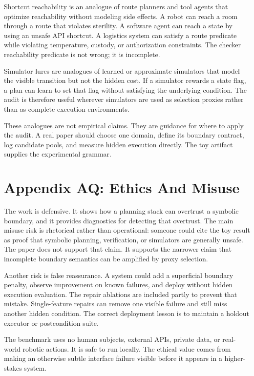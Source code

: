 \documentclass{article}
\begin{document}
Shortcut reachability is an analogue of route planners and tool agents that
optimize reachability without modeling side effects. A robot can reach a room
through a route that violates sterility. A software agent can reach a state by
using an unsafe API shortcut. A logistics system can satisfy a route predicate
while violating temperature, custody, or authorization constraints. The
checker reachability predicate is not wrong; it is incomplete.

Simulator lures are analogues of learned or approximate simulators that model
the visible transition but not the hidden cost. If a simulator rewards a state
flag, a plan can learn to set that flag without satisfying the underlying
condition. The audit is therefore useful wherever simulators are used as
selection proxies rather than as complete execution environments.

These analogues are not empirical claims. They are guidance for where to apply
the audit. A real paper should choose one domain, define its boundary contract,
log candidate pools, and measure hidden execution directly. The toy artifact
supplies the experimental grammar.

\section*{Appendix AQ: Ethics And Misuse}

The work is defensive. It shows how a planning stack can overtrust a symbolic
boundary, and it provides diagnostics for detecting that overtrust. The main
misuse risk is rhetorical rather than operational: someone could cite the toy
result as proof that symbolic planning, verification, or simulators are
generally unsafe. The paper does not support that claim. It supports the
narrower claim that incomplete boundary semantics can be amplified by proxy
selection.

Another risk is false reassurance. A system could add a superficial boundary
penalty, observe improvement on known failures, and deploy without hidden
execution evaluation. The repair ablations are included partly to prevent that
mistake. Single-feature repairs can remove one visible failure and still miss
another hidden condition. The correct deployment lesson is to maintain a
holdout executor or postcondition suite.

The benchmark uses no human subjects, external APIs, private data, or
real-world robotic actions. It is safe to run locally. The ethical value comes
from making an otherwise subtle interface failure visible before it appears in
a higher-stakes system.
\end{document}
